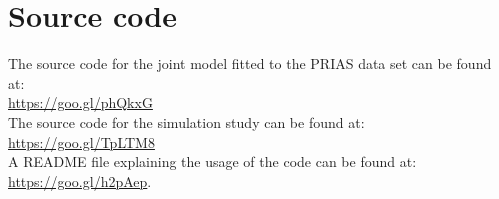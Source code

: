 \section{Source code}
The source code for the joint model fitted to the PRIAS data set can be found at:\\
\url{https://goo.gl/phQkxG}\\
The source code for the simulation study can be found at:\\
\url{https://goo.gl/TpLTM8}\\
A README file explaining the usage of the code can be found at:\\
\url{https://goo.gl/h2pAep}.\\
